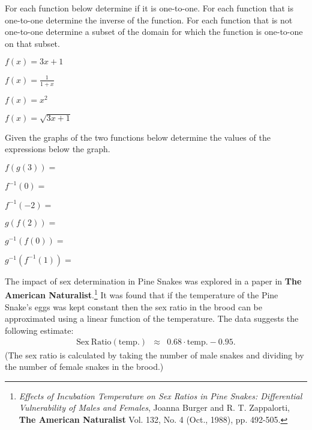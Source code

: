 \begin{problem}
\item For each function below determine if it is one-to-one. For each
  function that is one-to-one determine the inverse of the
  function. For each function that is not one-to-one determine a
  subset of the domain for which the function is one-to-one on that
  subset. 
  \begin{subproblem}
    \item $f(x)=3x+1$
      \vfill
    \item $f(x)=\frac{1}{1+x}$
      \vfill
    \item $f(x)=x^2$
      \vfill
    \item $f(x)=\sqrt{3x+1}$
      \vfill
  \end{subproblem}

  \clearpage

\item Given the graphs of the two functions below determine the values
  of the expressions below the graph.

  \hspace*{-6em}
  \scalebox{0.95}{}

  \begin{subproblem}
    \item $f(g(3)) =$
      \vfill
    \item $f^{-1}(0) =$
      \vfill
    \item $f^{-1}(-2) = $
      \vfill
    \item $g(f(2)) = $
      \vfill
    \item $g^{-1}(f(0)) = $
      \vfill
    \item $g^{-1}(f^{-1}(1)) = $
      \vfill
  \end{subproblem}

\clearpage

\item The impact of sex determination in Pine Snakes was explored in a
  paper in \textbf{The American Naturalist}.\footnote{\textit{Effects
      of Incubation Temperature on Sex Ratios in Pine Snakes:
      Differential Vulnerability of Males and Females}, Joanna Burger
    and R. T. Zappalorti, \textbf{The American Naturalist} Vol. 132,
    No. 4 (Oct., 1988), pp. 492-505.} It was found that if the
  temperature of the Pine Snake's eggs was kept constant then the
  sex ratio in the brood can be approximated using a linear function
  of the temperature. The data suggests the following estimate:
  \begin{eqnarray*}
    \mathrm{Sex~Ratio(temp.)} & \approx & 0.68\cdot\mathrm{temp.}-0.95.
  \end{eqnarray*}
  (The sex ratio is calculated by taking the number of male snakes and
  dividing by the number of female snakes in the brood.)

\end{problem}

